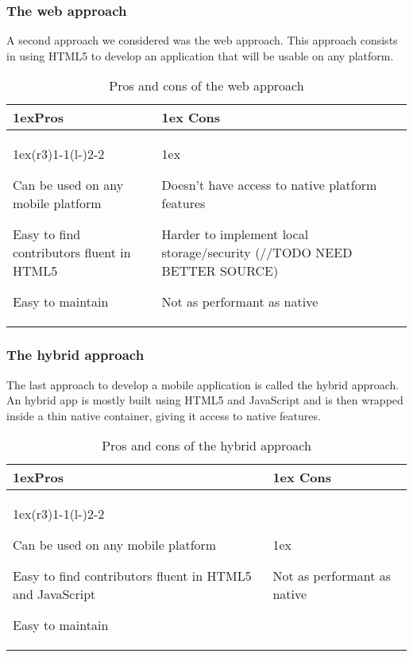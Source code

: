 \documentclass[12pt]{article} %
\begin{document}
\subsubsection{The web approach}
A second approach we considered was the web approach. This approach consists in using HTML5 to develop an application that will be usable on any platform.


\begin{table}[H]
\begin{tabularx}{\linewidth}{>{\parskip1ex}X@{\kern4\tabcolsep}>{\parskip1ex}X}
\toprule
\hfil\bfseries Pros
&
\hfil\bfseries Cons
\\\cmidrule(r{3\tabcolsep}){1-1}\cmidrule(l{-\tabcolsep}){2-2}

Can be used on any mobile platform\par
Easy to find contributors fluent in HTML5\par
Easy to maintain\par

&

Doesn't have access to native platform features\par
Harder to implement local storage/security (//TODO NEED BETTER SOURCE)\par
Not as performant as native\par



\\\bottomrule
\end{tabularx}
\caption{Pros and cons of the web approach}
\end{table}
\subsubsection{The hybrid approach}

The last approach to develop a mobile application is called the hybrid approach. An hybrid app is mostly built using HTML5 and JavaScript and is then wrapped inside a thin native container, giving it access to native features.

\begin{table}[H]
\begin{tabularx}{\linewidth}{>{\parskip1ex}X@{\kern4\tabcolsep}>{\parskip1ex}X}
\toprule
\hfil\bfseries Pros
&
\hfil\bfseries Cons
\\\cmidrule(r{3\tabcolsep}){1-1}\cmidrule(l{-\tabcolsep}){2-2}

Can be used on any mobile platform\par
Easy to find contributors fluent in HTML5 and JavaScript\par
Easy to maintain\par

&

Not as performant as native\par



\\\bottomrule
\end{tabularx}
\caption{Pros and cons of the hybrid approach}
\end{table}
\end{document}
